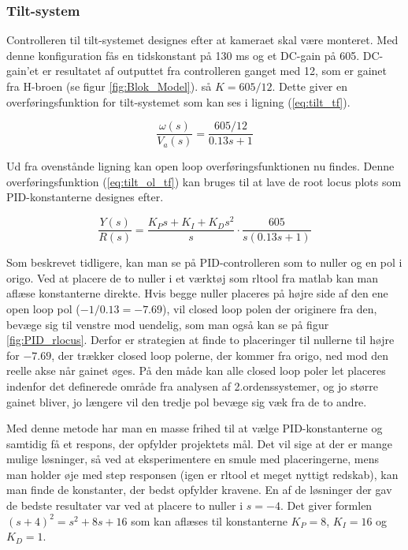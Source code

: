 \subsubsection{Tilt-system}

Controlleren til tilt-systemet designes efter at kameraet skal være monteret. Med denne konfiguration fås en tidskonstant på 130 ms og et DC-gain på 605. DC-gain'et er resultatet af outputtet fra controlleren ganget med 12, som er gainet fra H-broen (se figur \ref{fig:Blok_Model}). så $K=605/12$. Dette giver en overføringsfunktion for tilt-systemet som kan ses i ligning (\ref{eq:tilt_tf}). 

\begin{equation}\label{eq:tilt_tf}
\frac{\omega(s)}{V_{a}(s)}=\frac{605/12}{0.13s+1}
\end{equation}

Ud fra ovenstånde ligning kan open loop overføringsfunktionen nu findes. Denne overføringsfunktion (\ref{eq:tilt_ol_tf}) kan bruges til at lave de root locus plots som PID-konstanterne designes efter.

\begin{equation}\label{eq:tilt_ol_tf}
\frac{Y(s)}{R(s)}=\frac{K_{P}s+K_{I}+K_{D}s^2}{s}\cdot\frac{605}{s(0.13s+1)}
\end{equation}

Som beskrevet tidligere, kan man se på PID-controlleren som to nuller og en pol i origo. Ved at placere de to nuller i et værktøj som rltool fra matlab kan man aflæse konstanterne direkte. Hvis begge nuller placeres på højre side af den ene open loop pol ($-1/0.13=-7.69$), vil closed loop polen der originere fra den, bevæge sig til venstre mod uendelig, som man også kan se på figur \ref{fig:PID_rlocus}. Derfor er strategien at finde to placeringer til nullerne til højre for $-7.69$, der trækker closed loop polerne, der kommer fra origo, ned mod den reelle akse når gainet øges. På den måde kan alle closed loop poler let placeres indenfor det definerede område fra analysen af 2.ordenssystemer, og jo større gainet bliver, jo længere vil den tredje pol bevæge sig væk fra de to andre.

Med denne metode har man en masse frihed til at vælge PID-konstanterne og samtidig få et respons, der opfylder projektets mål. Det vil sige at der er mange mulige løsninger, så ved at eksperimentere en smule med placeringerne, mens man holder øje med step responsen (igen er rltool et meget nyttigt redskab), kan man finde de konstanter, der bedst opfylder kravene. En af de løsninger der gav de bedste resultater var ved at placere to nuller i $s=-4$. Det giver formlen $(s+4)^2=s^2+8s+16$ som kan aflæses til konstanterne $K_{P}=8$, $K_{I}=16$ og $K_{D}=1$. 

